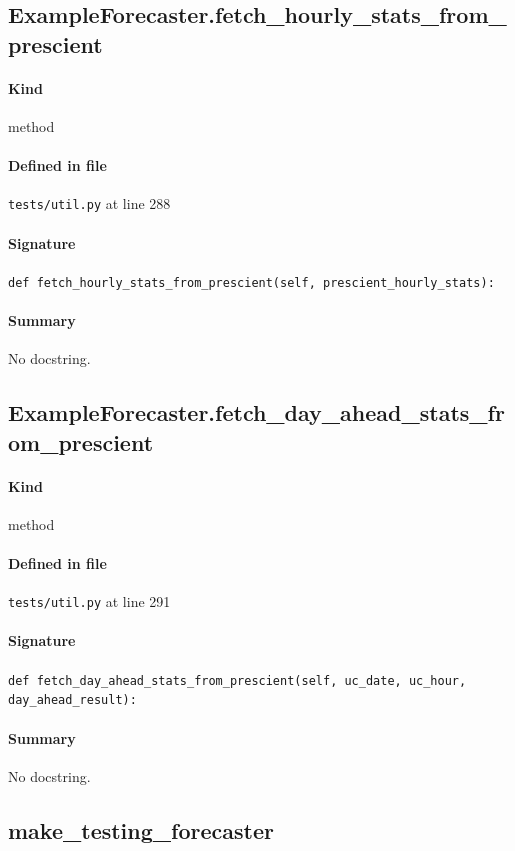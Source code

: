 \documentclass[11pt]{report}
\begin{document}
\subsection{ExampleForecaster.fetch\_hourly\_stats\_from\_prescient}
\label{def:tests-util.py:ExampleForecaster.fetch_hourly_stats_from_prescient:L288}
\paragraph{Kind} method
\paragraph{Defined in file} \texttt{tests/util.py} at line 288
\paragraph{Signature} \texttt{def fetch\_hourly\_stats\_from\_prescient(self, prescient\_hourly\_stats):}
\paragraph{Summary} No docstring.
\subsection{ExampleForecaster.fetch\_day\_ahead\_stats\_from\_prescient}
\label{def:tests-util.py:ExampleForecaster.fetch_day_ahead_stats_from_prescient:L291}
\paragraph{Kind} method
\paragraph{Defined in file} \texttt{tests/util.py} at line 291
\paragraph{Signature} \texttt{def fetch\_day\_ahead\_stats\_from\_prescient(self, uc\_date, uc\_hour, day\_ahead\_result):}
\paragraph{Summary} No docstring.
\subsection{make\_testing\_forecaster}
\label{def:tests-util.py:make_testing_forecaster:L337}
\end{document}
